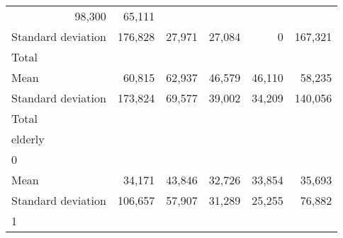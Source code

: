 \begin{tabular}{llllll}
  \multicolumn{1}{r}{98,300} &
  \multicolumn{1}{r}{65,111} \\
\multicolumn{1}{l}{\hspace{4em}Standard deviation} &
  \multicolumn{1}{|r}{176,828} &
  \multicolumn{1}{r}{27,971} &
  \multicolumn{1}{r}{27,084} &
  \multicolumn{1}{r}{0} &
  \multicolumn{1}{r}{167,321} \\
\multicolumn{1}{l}{\hspace{3em}Total} &
  \multicolumn{1}{|r}{} &
  \multicolumn{1}{r}{} &
  \multicolumn{1}{r}{} &
  \multicolumn{1}{r}{} &
  \multicolumn{1}{r}{} \\
\multicolumn{1}{l}{\hspace{4em}Mean} &
  \multicolumn{1}{|r}{60,815} &
  \multicolumn{1}{r}{62,937} &
  \multicolumn{1}{r}{46,579} &
  \multicolumn{1}{r}{46,110} &
  \multicolumn{1}{r}{58,235} \\
\multicolumn{1}{l}{\hspace{4em}Standard deviation} &
  \multicolumn{1}{|r}{173,824} &
  \multicolumn{1}{r}{69,577} &
  \multicolumn{1}{r}{39,002} &
  \multicolumn{1}{r}{34,209} &
  \multicolumn{1}{r}{140,056} \\
\multicolumn{1}{l}{\hspace{1em}Total} &
  \multicolumn{1}{|r}{} &
  \multicolumn{1}{r}{} &
  \multicolumn{1}{r}{} &
  \multicolumn{1}{r}{} &
  \multicolumn{1}{r}{} \\
\multicolumn{1}{l}{\hspace{2em}elderly} &
  \multicolumn{1}{|r}{} &
  \multicolumn{1}{r}{} &
  \multicolumn{1}{r}{} &
  \multicolumn{1}{r}{} &
  \multicolumn{1}{r}{} \\
\multicolumn{1}{l}{\hspace{3em}0} &
  \multicolumn{1}{|r}{} &
  \multicolumn{1}{r}{} &
  \multicolumn{1}{r}{} &
  \multicolumn{1}{r}{} &
  \multicolumn{1}{r}{} \\
\multicolumn{1}{l}{\hspace{4em}Mean} &
  \multicolumn{1}{|r}{34,171} &
  \multicolumn{1}{r}{43,846} &
  \multicolumn{1}{r}{32,726} &
  \multicolumn{1}{r}{33,854} &
  \multicolumn{1}{r}{35,693} \\
\multicolumn{1}{l}{\hspace{4em}Standard deviation} &
  \multicolumn{1}{|r}{106,657} &
  \multicolumn{1}{r}{57,907} &
  \multicolumn{1}{r}{31,289} &
  \multicolumn{1}{r}{25,255} &
  \multicolumn{1}{r}{76,882} \\
\multicolumn{1}{l}{\hspace{3em}1} &
  \multicolumn{1}{|r}{} &

\end{tabular}
